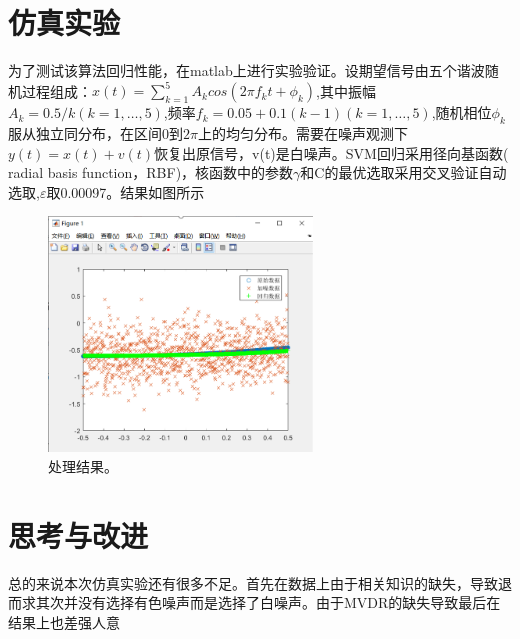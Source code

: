 \section{仿真实验}
为了测试该算法回归性能，在matlab上进行实验验证。设期望信号由五个谐波随机过程组成：$x\left(t\right)=\sum_{k=1}^{5}{A_kcos\left(2\pi f_kt+\phi_k\right)}$,其中振幅$A_k=0.5/k\left(k=1,\ldots,5\right)$,频率$f_k=0.05+0.1\left(k-1\right)\left(k=1,\ldots,5\right)$,随机相位$\phi_k$服从独立同分布，在区间0到$2\pi$上的均匀分布。需要在噪声观测下
$y\left(t\right)=x\left(t\right)+v\left(t\right)$恢复出原信号，v(t)是白噪声。SVM回归采用径向基函数( radial basis function，RBF)，核函数中的参数$\gamma$和C的最优选取采用交叉验证自动选取,$\varepsilon$取0.00097。结果如图所示
\begin{figure}[!htbp]
    \centering
    \includegraphics[width=7cm]{pic/res.png}%
    \caption{处理结果。}
    \label{fig:res}
\end{figure}


\section{思考与改进}
总的来说本次仿真实验还有很多不足。首先在数据上由于相关知识的缺失，导致退而求其次并没有选择有色噪声而是选择了白噪声。由于MVDR的缺失导致最后在结果上也差强人意

